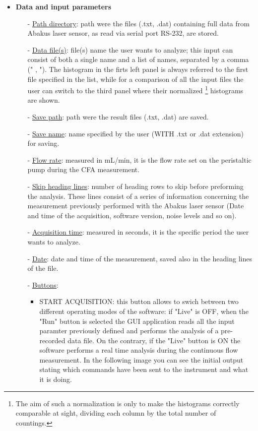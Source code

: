 \documentclass[a4paper, 11pt]{report}
\begin{document}
\begin{itemize}
\item \textbf{Data and input parameters}
\begin{itemize}
\item[-] \underline{Path directory}: path were the files (.txt, .dat) containing full data from Abakus laser sensor, as read via serial port RS-232, are stored.
\item[-] \underline{Data file(s)}: file(s) name the user wants to analyze; this input can consist of both a single name and a list of names, separated by a comma (" , ").
The histogram in the firts left panel is always referred to the first file specified in the list, while for a comparison of all the input files the user can switch to the third panel where their normalized \footnote{The aim of such a normalization is only to make the histograms correctly comparable at sight, dividing each column by the total number of countings.} histograms are shown.
\item[-] \underline{Save path}: path were the result files (.txt, .dat) are saved.
\item[-] \underline{Save name}: name specified by the user (WITH .txt or .dat extension) for saving.
\item[-] \underline{Flow rate}: measured in mL/min, it is the flow rate set on the peristaltic pump during the CFA measurement.
\item[-] \underline{Skip heading lines}: number of heading rows to skip before preforming the analysis. These lines consist of a series of information concerning the measurement previously performed with the Abakus laser sensor (Date and time of the acquisition, software version, noise levels and so on).
\item[-] \underline{Acquisition time}: measured in seconds, it is the specific period the user wants to analyze.
\item[-] \underline{Date}: date and time of the measurement, saved also in the heading lines of the file.
\item[-] \underline{Buttons}:
\begin{itemize}
\item START ACQUISITION: this button allows to swich between two different operating modes of the software: if "Live" is OFF, when the "Run" button is selected the GUI application reads all the input paramter previously defined and performs the analysis of a pre-recorded data file. On the contrary, if the "Live" button is ON the software performs a real time analysis during the continuous flow measurement. In the following image you can see the initial output stating which commands have been sent to the instrument and what it is doing.

\end{itemize}
\end{itemize}
\end{itemize}
\end{document}
